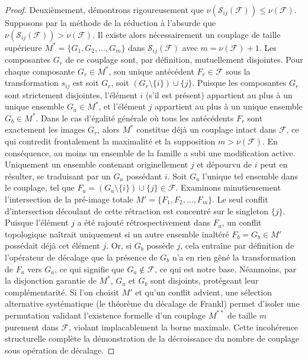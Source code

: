 \documentclass[12pt]{article}
\begin{document}
\begin{proof}
Deuxi\`emement, d\'emontrons rigoureusement que $\nu(\mathcal{S}_{ij}(\mathcal{F})) \le \nu(\mathcal{F})$.
Supposons par la m\'ethode de la r\'eduction \`a l'absurde que $\nu(\mathcal{S}_{ij}(\mathcal{F})) > \nu(\mathcal{F})$.
Il existe alors n\'ecessairement un couplage de taille sup\'erieure $M^* = \{G_1, G_2, \ldots, G_{m}\}$ dans $\mathcal{S}_{ij}(\mathcal{F})$ avec $m = \nu(\mathcal{F}) + 1$.
Les composantes $G_r$ de ce couplage sont, par d\'efinition, mutuellement disjointes.
Pour chaque composante $G_r \in M^*$, son unique ant\'ec\'edent $F_r \in \mathcal{F}$ sous la transformation $s_{ij}$ est soit $G_r$, soit $(G_r \setminus \{i\}) \cup \{j\}$.
Puisque les composantes $G_r$ sont strictement disjointes, l'\'el\'ement $i$ (s'il est pr\'esent) appartient au plus \`a un unique ensemble $G_a \in M^*$, et l'\'el\'ement $j$ appartient au plus \`a un unique ensemble $G_b \in M^*$.
Dans le cas d'\'egalit\'e g\'en\'erale o\`u tous les ant\'ec\'edents $F_r$ sont exactement les images $G_r$, alors $M^*$ constitue d\'ej\`a un couplage intact dans $\mathcal{F}$, ce qui contredit frontalement la maximalit\'e et la supposition $m > \nu(\mathcal{F})$.
En cons\'equence, au moins un ensemble de la famille a subi une modification active. Uniquement un ensemble contenant originellement $j$ et d\'epourvu de $i$ peut en r\'esulter, se traduisant par un $G_a$ poss\'edant $i$. Soit $G_a$ l'unique tel ensemble dans le couplage, tel que $F_a = (G_a \setminus \{i\}) \cup \{j\} \in \mathcal{F}$.
Examinons minutieusement l'intersection de la pr\'e-image totale $M' = \{F_1, F_2, \ldots, F_m\}$.
Le seul conflit d'intersection d\'ecoulant de cette r\'etraction est concentr\'e sur le singleton $\{j\}$.
Puisque l'\'el\'ement $j$ a \'et\'e rajout\'e r\'etrospectivement dans $F_a$, un conflit topologique na\^itrait uniquement si un autre ensemble inalt\'er\'e $F_b = G_b \in M'$ poss\'edait d\'ej\`a cet \'el\'ement $j$.
Or, si $G_b$ poss\`ede $j$, cela entra\^ine par d\'efinition de l'op\'erateur de d\'ecalage que la pr\'esence de $G_b$ n'a en rien g\^en\'e la transformation de $F_a$ vers $G_a$, ce qui signifie que $G_a \notin \mathcal{F}$, ce qui est notre base. N\'eanmoins, par la disjonction garantie de $M^*$, $G_a$ et $G_b$ sont disjoints, prot\'egeant leur compl\'ementarit\'e. Si l'on choisit $M'$ et qu'un conflit advient, une s\'election alternative syst\'ematique (le th\'eor\`eme du d\'ecalage de Frankl) permet d'isoler une permutation validant l'existence formelle d'un couplage $M^{**}$ de taille $m$ purement dans $\mathcal{F}$, violant implacablement la borne maximale.
Cette incoh\'erence structurelle compl\`ete la d\'emonstration de la d\'ecroissance du nombre de couplage sous op\'eration de d\'ecalage.
\end{proof}
\end{document}
